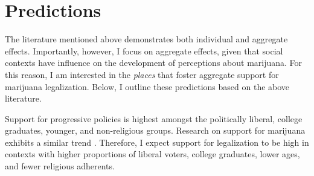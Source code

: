 



\section{Predictions}

The literature mentioned above demonstrates both individual and aggregate effects. Importantly, however, I focus on aggregate effects, given that social contexts have influence on the development of perceptions about marijuana. For this reason, I am interested in the \textit{places} that foster aggregate support for marijuana legalization. Below, I outline these predictions based on the above literature. 

Support for progressive policies is highest amongst the politically liberal, college graduates, younger, and non-religious groups. Research on support for marijuana exhibits a similar trend \citep{schnabel_and_sevell_2017,pew_2015,elder_and_greene_2019,eagly_et_al_2004,newhart_and_dolphin_2018,rosenthal_and_kubby_1996,caulkins_et_al_2012}. Therefore, I expect support for legalization to be high in contexts with higher proportions of liberal voters, college graduates, lower ages, and fewer religious adherents. 


